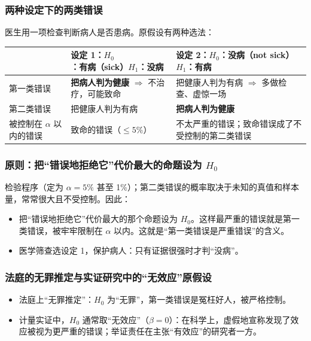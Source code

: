 \subsubsection{两种设定下的两类错误}

医生用一项检查判断病人是否患病。原假设有两种选法：
\begin{center}
\small
\begin{tabularx}{\linewidth}{@{}l L L@{}}
\toprule
 & 设定 1：$H_0$：有病（sick）\newline\phantom{设定 1：}$H_1$：没病 & 设定 2：$H_0$：没病（not sick）\newline\phantom{设定 2：}$H_1$：有病\\
\midrule
第一类错误 & \textbf{把病人判为健康} $\Rightarrow$ 不治疗，可能致命 & 把健康人判为有病 $\Rightarrow$ 多做检查、虚惊一场\\
第二类错误 & 把健康人判为有病 & \textbf{把病人判为健康}\\
被控制在 $\alpha$ 以内的错误 & 致命的错误（$\le5\%$） & 不太严重的错误；致命错误成了不受控制的第二类错误\\
\bottomrule
\end{tabularx}
\end{center}

\subsubsection{原则：把“错误地拒绝它”代价最大的命题设为 \texorpdfstring{$H_0$}{H0}}

检验程序（定为 $\alpha=5\%$ 甚至 1\%）；第二类错误的概率取决于未知的真值和样本量，常常很大且不受控制。因此：
\begin{itemize}
  \item 把“错误地拒绝它”代价最大的那个命题设为 $H_0$。这样最严重的错误就是第一类错误，被牢牢限制在 $\alpha$ 以内。这就是“第一类错误是严重错误”的含义。
  \item 医学筛查选设定 1，保护病人：只有证据很强时才判“没病”。
\end{itemize}

\subsubsection{法庭的无罪推定与实证研究中的“无效应”原假设}

\begin{itemize}
  \item 法庭上“无罪推定”：$H_0$ 为“无罪”，第一类错误是冤枉好人，被严格控制。
  \item 计量实证中，$H_0$ 通常取“无效应”（$\beta=0$）：在科学上，虚假地宣称发现了效应被视为更严重的错误；举证责任在主张“有效应”的研究者一方。
\end{itemize}

